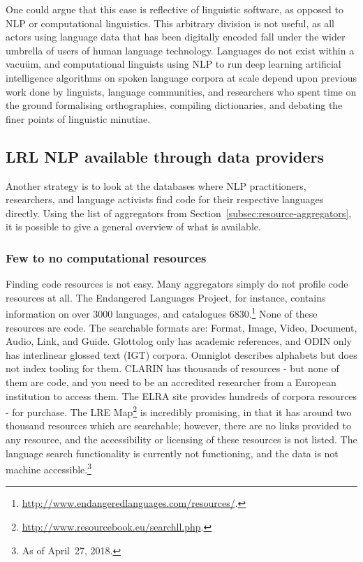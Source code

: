 One could argue that this case is reflective of linguistic software, as opposed to NLP or computational linguistics. This arbitrary division is not useful, as all actors using language data that has been digitally encoded fall under the wider umbrella of users of human language technology. Languages do not exist within a vacu\"{u}m, and computational linguists using NLP to run deep learning artificial intelligence algorithms on spoken language corpora at scale depend upon previous work done by linguists, language communities, and researchers who spent time on the ground formalising orthographies, compiling dictionaries, and debating the finer points of linguistic minutiae.

\subsection{LRL NLP available through data providers}
\label{subsec:lrl-nlp-through-providers}

Another strategy is to look at the databases where NLP practitioners, researchers, and language activists find code for their respective languages directly. Using the list of aggregators from Section~\ref{subsec:resource-aggregators}, it is possible to give a general overview of what is available.

\subsubsection{Few to no computational resources}

Finding code resources is not easy. Many aggregators simply do not profile code resources at all. The Endangered Languages Project, for instance, contains information on over 3000 languages, and catalogues 6830.\footnote{\href{http://www.endangeredlanguages.com/resources/}{http://www.endangeredlanguages.com/resources/}. } None of these resources are code. The searchable formats are: Format, Image, Video, Document, Audio, Link, and Guide. Glottolog only has academic references, and ODIN only has interlinear glossed text (IGT) corpora. Omniglot describes alphabets but does not index tooling for them. CLARIN has thousands of resources - but none of them are code, and you need to be an accredited researcher from a European institution to access them. The ELRA site provides hundreds of corpora resources - for purchase. The LRE Map\footnote{\href{http://www.resourcebook.eu/searchll.php}{http://www.resourcebook.eu/searchll.php}. } is incredibly promising, in that it has around two thousand resources which are searchable; however, there are no links provided to any resource, and the accessibility or licensing of these resources is not listed. The language search functionality is currently not functioning, and the data is not machine accessible.\footnote{As of April~27, 2018.}


